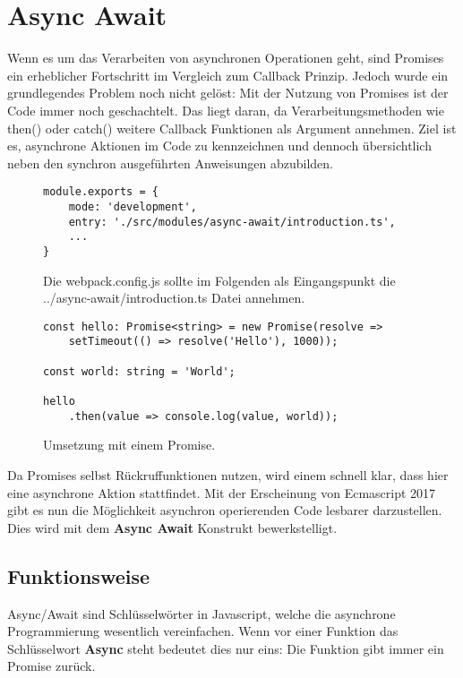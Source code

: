 \section{Async Await}
Wenn es um das Verarbeiten von asynchronen Operationen geht, sind Promises ein erheblicher Fortschritt im Vergleich zum Callback Prinzip. Jedoch wurde ein grundlegendes Problem noch nicht gelöst: Mit der Nutzung von Promises ist der Code immer noch geschachtelt. Das liegt daran, da Verarbeitungsmethoden wie then() oder catch() weitere Callback Funktionen als Argument annehmen. Ziel ist es, asynchrone Aktionen im Code zu kennzeichnen und dennoch übersichtlich neben den synchron ausgeführten Anweisungen abzubilden. 

\begin{figure}[H]
\begin{lstlisting}[basicstyle=\small]
module.exports = {
    mode: 'development',
    entry: './src/modules/async-await/introduction.ts',
    ...
}
\end{lstlisting}
\caption{Die webpack.config.js sollte im Folgenden als Eingangspunkt die ../async-await/introduction.ts Datei annehmen.}
\end{figure}

\begin{figure}[H]
\begin{lstlisting}[basicstyle=\small]
const hello: Promise<string> = new Promise(resolve =>
    setTimeout(() => resolve('Hello'), 1000));
    
const world: string = 'World';

hello
    .then(value => console.log(value, world));
\end{lstlisting}
\caption{Umsetzung mit einem Promise.}
\label{Promise-comparison-async-await}
\end{figure}

\noindent
Da Promises selbst Rückruffunktionen nutzen, wird einem schnell klar, dass hier eine asynchrone Aktion stattfindet. Mit der Erscheinung von Ecmascript 2017 gibt es nun die Möglichkeit asynchron operierenden Code lesbarer darzustellen. Dies wird mit dem \textbf{Async Await} Konstrukt bewerkstelligt. 

\subsection{Funktionsweise}

Async/Await sind Schlüsselwörter in Javascript, welche die asynchrone Programmierung wesentlich vereinfachen. Wenn vor einer Funktion das Schlüsselwort \textbf{Async} steht bedeutet dies nur eins: Die Funktion gibt immer ein Promise zurück.


